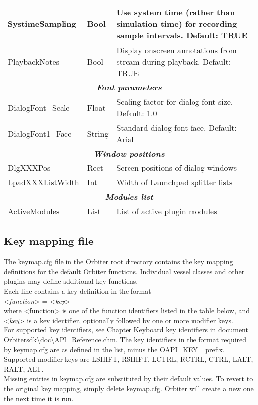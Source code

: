 \documentclass[Orbiter Developer Manual.tex]{subfiles}
\begin{document}
\begin{longtable}{ |p{}|p{}|p{}| }
	SystimeSampling & Bool & Use system time (rather than simulation time) for recording sample intervals. Default: TRUE\\
	\hline\rule{0pt}{2ex}
	PlaybackNotes & Bool & Display onscreen annotations from stream during playback. Default: TRUE\\
	\hline
	\multicolumn{3}{|c|}{\rule{0pt}{2ex}\textbf{\textit{Font parameters}}}\\
	\hline\rule{0pt}{2ex}
	DialogFont\_Scale & Float & Scaling factor for dialog font size. Default: 1.0\\
	\hline\rule{0pt}{2ex}
	DialogFont1\_Face & String & Standard dialog font face. Default: Arial\\
	\hline
	\multicolumn{3}{|c|}{\rule{0pt}{2ex}\textbf{\textit{Window positions}}}\\
	\hline\rule{0pt}{2ex}
	DlgXXXPos & Rect & Screen positions of dialog windows\\
	\hline\rule{0pt}{2ex}
	LpadXXXListWidth & Int & Width of Launchpad splitter lists\\
	\hline
	\multicolumn{3}{|c|}{\rule{0pt}{2ex}\textbf{\textit{Modules list}}}\\
	\hline\rule{0pt}{2ex}
	ActiveModules & List & List of active plugin modules\\
	\hline
	\end{longtable}


\subsection{Key mapping file}
The keymap.cfg file in the Orbiter root directory contains the key mapping definitions for the default Orbiter functions. Individual vessel classes and other plugins may define additional key functions.\\
Each line contains a key definition in the format\\
\indent <\textit{function}> = <\textit{key}>\\
where <function> is one of the function identifiers listed in the table below, and <\textit{key}> is a key identifier, optionally followed by one or more modifier keys.\\
For supported key identifiers, see Chapter Keyboard key identifiers in document Orbitersdk\textbackslash doc\textbackslash API\_Reference.chm. The key identifiers in the format required by keymap.cfg are as defined in the list, minus the OAPI\_KEY\_ prefix.\\
Supported modifier keys are LSHIFT, RSHIFT, LCTRL, RCTRL, CTRL, LALT, RALT, ALT.\\
Missing entries in keymap.cfg are substituted by their default values. To revert to the original key mapping, simply delete keymap.cfg. Orbiter will create a new one the next time it is run.
\end{document}
